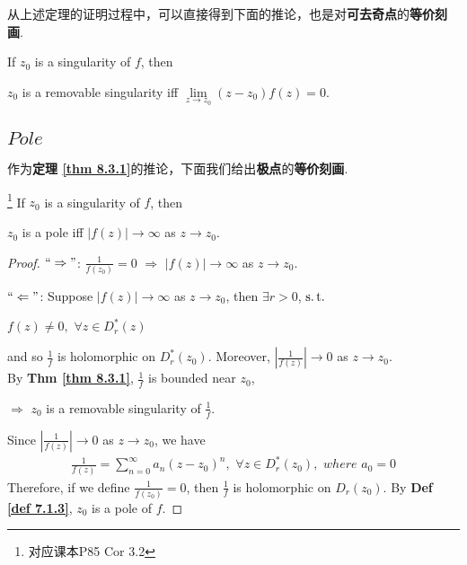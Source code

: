 	\vspace{3em}
	从上述定理的证明过程中，可以直接得到下面的推论，也是对\textbf{可去奇点}的\textbf{等价刻画}.
	\begin{corollary}\label{cor 8.3.2}
		If $z_0$ is a singularity of $f$, then
		\begin{center}
			$z_0$ is a removable singularity \hspace*{1em} iff \hspace*{1em} $\underset{z \to z_0}{\lim}{(z - z_0)f(z)} = 0$.
		\end{center}
	\end{corollary}

\newpage
\subsection{$Pole$}
	作为\textbf{定理 \ref{thm 8.3.1}}的推论，下面我们给出\textbf{极点}的\textbf{等价刻画}.
	\begin{corollary}\label{cor 8.3.3}\footnote{对应课本P85 Cor 3.2}
		If $z_0$ is a singularity of $f$, then
		\begin{center}
			$z_0$ is a pole \hspace*{1em} iff \hspace*{1em} $\left| f(z) \right| \to \infty$ as $z \to z_0$.
		\end{center}
	
		\vspace{2em}
		\begin{proof}
			$`` \Rightarrow "$: $\frac{1}{f(z_0)} = 0 \,\, \Rightarrow \,\, \left| f(z) \right| \to \infty$ as $z \to z_0$. 
			
			\vspace{1em}
			$`` \Leftarrow "$: Suppose $\left| f(z) \right| \to \infty$ as $z \to z_0$, then $\exists r > 0$, $\operatorname{s.t.}$
			\begin{center}
				$f(z) \neq 0 , \,\, \forall z \in D_{r}^{*}(z)$
			\end{center}
			and so $\frac{1}{f}$ is holomorphic on $D_{r}^{*}(z_0)$. Moreover, $\left| \frac{1}{f(z)} \right| \to 0$ as $z \to z_0$. \\
			By \textbf{Thm \ref{thm 8.3.1}}, $\frac{1}{f}$ is bounded near $z_0$,
			\begin{center}
				$\Rightarrow \,\, z_0$ is a removable singularity of $\frac{1}{f}$.
			\end{center}
			Since $\left| \frac{1}{f(z)} \right| \to 0$ as $z \to z_0$, we have
			\begin{align}
				\frac{1}{f(z)} = \sum_{n = 0}^{\infty}{a_n (z - z_0)^n} , \,\, \forall z \in D_{r}^{*}(z_0) , \,\, where \,\, a_0 = 0
			\end{align}
			Therefore, if we define $\frac{1}{f(z_0)} = 0$, then $\frac{1}{f}$ is holomorphic on $D_{r}(z_0)$. By \textbf{Def \ref{def 7.1.3}}, $z_0$ is a pole of $f$. 
		\end{proof}
	\end{corollary}

